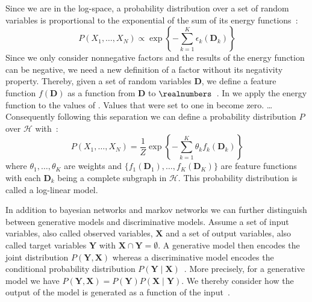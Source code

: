 Since we are in the log-space, a \gls{probability distribution} over a set of \glspl{random variable} is proportional to the exponential of the sum of its energy functions~\citep{koller2009probabilistic}:
\begin{equation}
  \label{equ:p-energy-function}
  P\left(X_1,\dots,X_N\right) \propto \exp\left\{-\sum_{k=1}^K\epsilon_k\left(\mathbf{D}_k\right)\right\}
\end{equation}
Since we only consider nonnegative \glspl{factor} and the results of the \gls{energy function} can be negative, we need a new definition of a \gls{factor} without its negativity property.
Thereby, given a set of \glspl{random variable} $\mathbf{D}$, we define a \gls{feature function} $f(\mathbf{D})$ as a function from $\mathbf{D}$ to $\realnumbers$~\citep{koller2009probabilistic}.
In  we apply the \gls{energy function} to the values of .
Values that were set to one in  become zero. \dots{}
Consequently following this separation we can define a \gls{probability distribution} $P$ over $\mathcal{H}$ with~\citep{koller2009probabilistic}:
\begin{equation}
  \label{equ:log-linear-model}
  P\left(X_1,\dots,X_N\right) = \frac{1}{Z}\exp\left\{-\sum_{k=1}^K \theta_k f_k\left(\mathbf{D}_k\right)\right\}
\end{equation}
where $\theta_1,\dots,\theta_K$ are weights and $\{f_1(\mathbf{D}_1),\dots,f_K(\mathbf{D}_K)\}$ are \glspl{feature function} with each $\mathbf{D}_k$ being a complete subgraph in $\mathcal{H}$.
This \gls{probability distribution} is called a \gls{log-linear model}.

\bigskip

In addition to \glspl{bayesian network} and \glspl{markov network} we can further distinguish between \glspl{generative model} and \glspl{discriminative model}.
Assume a set of input variables, also called \glspl{observed variable}, $\mathbf{X}$ and a set of output variables, also called \glspl{target variable} $\mathbf{Y}$ with $\mathbf{X}\cap\mathbf{Y}=\emptyset$.
A \gls{generative model} then encodes the \gls{joint distribution} $P(\mathbf{Y},\mathbf{X})$ whereas a \gls{discriminative model} encodes the \gls{conditional probability distribution} $P(\mathbf{Y}\mid\mathbf{X})$~\citep{koller2009probabilistic}.
More precisely, for a \gls{generative model} we have $P(\mathbf{Y},\mathbf{X})=P(\mathbf{Y})P(\mathbf{X}\mid\mathbf{Y})$.
We thereby consider how the output of the model is generated as a function of the input~\citep{sutton2010introduction}.

